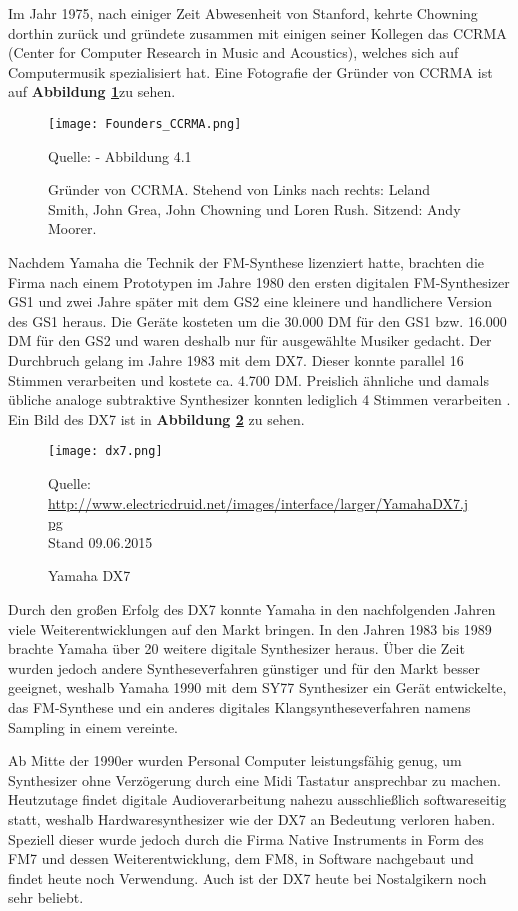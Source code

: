 Im Jahr 1975, nach einiger Zeit Abwesenheit von Stanford, kehrte Chowning dorthin zurück und gründete zusammen mit einigen seiner Kollegen das CCRMA (Center for Computer Research in Music and Acoustics), welches sich auf Computermusik spezialisiert hat.
Eine Fotografie der Gründer von CCRMA ist auf \textbf{Abbildung \ref{fig:foundersCCRMA}}zu sehen.

\begin{figure} [ht]
\centering
  \texttt{[image: Founders\_CCRMA.png]}
\caption{Gründer von CCRMA. Stehend von Links nach rechts: Leland Smith, John Grea, John Chowning und Loren Rush. Sitzend: Andy Moorer.}
\label{fig:foundersCCRMA}
Quelle: \cite[S. 52]{soundofinnovation} - Abbildung 4.1
\end{figure}

Nachdem Yamaha die Technik der FM-Synthese lizenziert hatte, brachten die Firma nach einem Prototypen im Jahre 1980 den ersten digitalen FM-Synthesizer GS1 und zwei Jahre später mit dem GS2 eine kleinere und handlichere Version des GS1 heraus. Die Geräte kosteten um die 30.000 DM für den GS1 bzw. 16.000 DM für den GS2 und waren deshalb nur für ausgewählte Musiker gedacht. Der Durchbruch gelang im Jahre 1983 mit dem DX7. Dieser konnte parallel 16 Stimmen verarbeiten und kostete ca. 4.700 DM. Preislich ähnliche und damals übliche analoge subtraktive Synthesizer konnten lediglich 4 Stimmen verarbeiten \cite{fmGS1}. Ein Bild des DX7 ist in \textbf{Abbildung \ref{fig:dx7}} zu sehen.

 \begin{figure} [ht]
\centering
  \texttt{[image: dx7.png]}
\caption{Yamaha DX7}
\label{fig:dx7}
Quelle: \url{http://www.electricdruid.net/images/interface/larger/YamahaDX7.jpg}
\\Stand 09.06.2015
\end{figure}

Durch den großen Erfolg des DX7 konnte Yamaha in den nachfolgenden Jahren viele Weiterentwicklungen auf den Markt bringen. In den Jahren 1983 bis 1989 brachte Yamaha über 20 weitere digitale Synthesizer heraus. Über die Zeit wurden jedoch andere Syntheseverfahren günstiger und für den Markt besser geeignet, weshalb Yamaha 1990 mit dem SY77 Synthesizer ein Gerät entwickelte, das FM-Synthese und ein anderes digitales Klangsyntheseverfahren namens Sampling in einem vereinte.\cite{fmGS1}

Ab Mitte der 1990er wurden Personal Computer leistungsfähig genug, um Synthesizer ohne Verzögerung durch eine Midi Tastatur ansprechbar zu machen. Heutzutage findet digitale Audioverarbeitung nahezu ausschließlich softwareseitig statt, weshalb Hardwaresynthesizer wie der DX7 an Bedeutung verloren haben. Speziell dieser wurde jedoch durch die Firma Native Instruments in Form des FM7 und dessen Weiterentwicklung, dem FM8, in Software nachgebaut und findet heute noch Verwendung. Auch ist der DX7 heute bei Nostalgikern noch sehr beliebt.\cite{fmGS1}